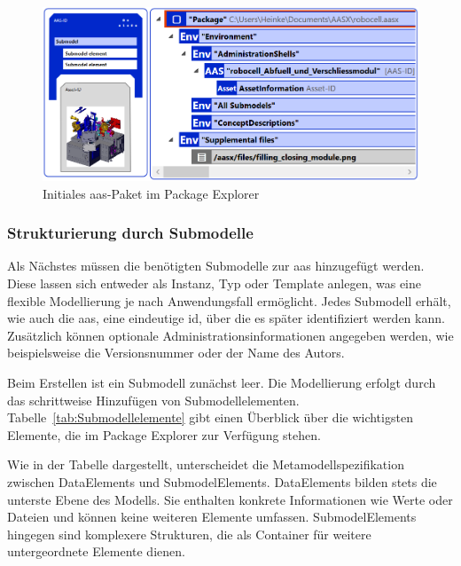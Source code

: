 \newpage
\begin{figure}[htbp]
    \centering
    \includegraphics[width=\textwidth]{Bilder/ModellierungAAS/Final/AASPaketPackageExplorer.PNG}
    \caption[Initiales \acs{aas}-Paket im Package Explorer]{Initiales \acs{aas}-Paket im Package Explorer}
    \label{fig:NeuesAASPaket}
\end{figure}



\subsubsection*{Strukturierung durch Submodelle}

Als Nächstes müssen die benötigten Submodelle zur \acs{aas} hinzugefügt werden.
Diese lassen sich entweder als Instanz, Typ oder Template anlegen, was eine flexible Modellierung je nach Anwendungsfall ermöglicht.
Jedes Submodell erhält, wie auch die \acs{aas}, eine eindeutige \acs{id}, über die es später identifiziert werden kann.
Zusätzlich können optionale Administrationsinformationen angegeben werden, wie beispielsweise die Versionsnummer oder der Name des Autors.

Beim Erstellen ist ein Submodell zunächst leer. 
Die Modellierung erfolgt durch das schrittweise Hinzufügen von Submodellelementen.
Tabelle~\ref{tab:Submodellelemente} gibt einen Überblick über die wichtigsten Elemente, die im Package Explorer zur Verfügung stehen.

\vspace{0.5em}

\vspace{-0.5em}

Wie in der Tabelle dargestellt, unterscheidet die Metamodellspezifikation \cite{SpezifikationPart1} zwischen DataElements und SubmodelElements.
DataElements bilden stets die unterste Ebene des Modells. 
Sie enthalten konkrete Informationen wie Werte oder Dateien und können keine weiteren Elemente umfassen.
SubmodelElements hingegen sind komplexere Strukturen, die als Container für weitere untergeordnete Elemente dienen.

